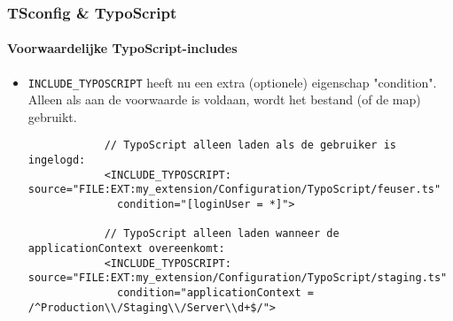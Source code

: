 \begin{frame}[fragile]
	\frametitle{TSconfig \& TypoScript}
	\framesubtitle{Voorwaardelijke TypoScript-includes}

	\lstset{basicstyle=\tiny\ttfamily}

	\begin{itemize}

		\item \texttt{INCLUDE\_TYPOSCRIPT} heeft nu een extra (optionele) eigenschap "condition". 
			Alleen als aan de voorwaarde is voldaan, wordt het bestand (of de map) gebruikt.

		\begin{lstlisting}
			// TypoScript alleen laden als de gebruiker is ingelogd:
			<INCLUDE_TYPOSCRIPT: source="FILE:EXT:my_extension/Configuration/TypoScript/feuser.ts"
			  condition="[loginUser = *]">

			// TypoScript alleen laden wanneer de applicationContext overeenkomt:
			<INCLUDE_TYPOSCRIPT: source="FILE:EXT:my_extension/Configuration/TypoScript/staging.ts"
			  condition="applicationContext = /^Production\\/Staging\\/Server\\d+$/">
		\end{lstlisting}

	\end{itemize}

\end{frame}

